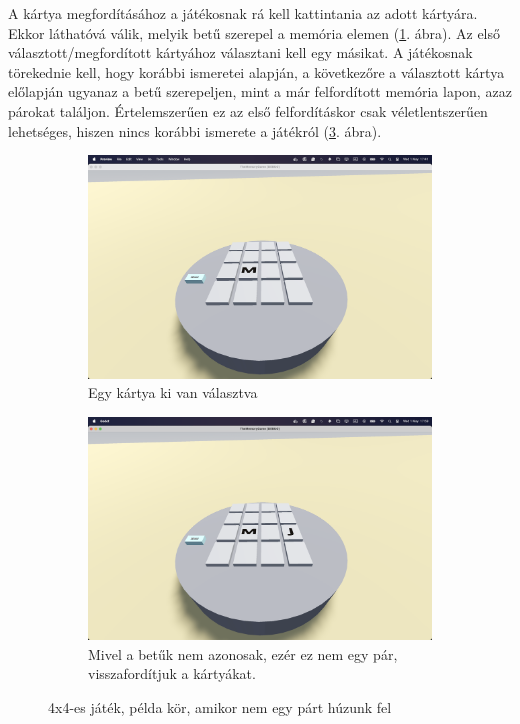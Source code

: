 A kártya megfordításához a játékosnak rá kell kattintania az adott kártyára. 
Ekkor láthatóvá válik, melyik betű szerepel a memória elemen (\ref{img:kartya_fliped}. ábra). 
Az első választott/megfordított kártyához választani kell egy másikat. A játékosnak törekednie kell, hogy korábbi ismeretei alapján, a következőre a választott kártya előlapján ugyanaz a betű szerepeljen, mint a már felfordított memória lapon, azaz párokat találjon.
Értelemszerűen ez az első felfordításkor csak véletlentszerűen lehetséges, hiszen nincs korábbi ismerete a játékról (\ref{img:non_pair}. ábra).
\begin{figure}[h]
\begin{subfigure}[t]{0.5\textwidth}
    \includegraphics[width=\linewidth]{img/asztal_4x4_card_flipped.png}
    \caption{Egy kártya ki van választva}
    \label{img:kartya_fliped}
\end{subfigure}
\begin{subfigure}[t]{0.5\textwidth}
    \includegraphics[width=\linewidth]{img/asztal_4x4_non_pair.png}
    \caption{Mivel a betűk nem azonosak, ezér ez nem egy pár, visszafordítjuk a kártyákat.}
    \label{img:non_pair}
\end{subfigure}
\caption{4x4-es játék, példa kör, amikor nem egy párt húzunk fel}
\end{figure}



